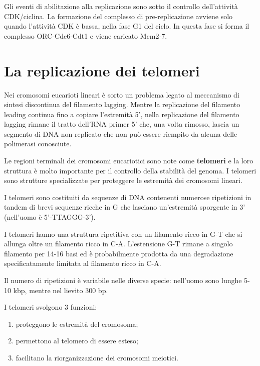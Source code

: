 \documentclass[11pt]{book}
\begin{document}
Gli eventi di abilitazione alla replicazione sono sotto il controllo
dell'attività CDK/ciclina. La formazione del complesso di
pre-replicazione avviene solo quando l'attività CDK è bassa, nella fase
G1 del ciclo. In questa fase si forma il complesso ORC-Cdc6-Cdt1 e viene
caricato Mcm2-7.

\section{La replicazione dei
telomeri}\label{la-replicazione-dei-telomeri}

Nei cromosomi eucarioti lineari è sorto un problema legato al meccanismo
di sintesi discontinua del filamento lagging. Mentre la replicazione del
filamento leading continua fino a copiare l'estremità 5', nella
replicazione del filamento lagging rimane il tratto dell'RNA primer 5'
che, una volta rimosso, lascia un segmento di DNA non replicato che non
può essere riempito da alcuna delle polimerasi conosciute.

Le regioni terminali dei cromosomi eucariotici sono note come
\textbf{telomeri} e la loro struttura è molto importante per il
controllo della stabilità del genoma. I telomeri sono strutture
specializzate per proteggere le estremità dei cromosomi lineari.

I telomeri sono costituiti da sequenze di DNA contenenti numerose
ripetizioni in tandem di brevi sequenze ricche in G che lasciano
un'estremità sporgente in 3' (nell'uomo è 5'-TTAGGG-3').

I telomeri hanno una struttura ripetitiva con un filamento ricco in G-T
che si allunga oltre un filamento ricco in C-A. L'estensione G-T rimane
a singolo filamento per 14-16 basi ed è probabilmente prodotta da una
degradazione specificatamente limitata al filamento ricco in C-A.

Il numero di ripetizioni è variabile nelle diverse specie: nell'uomo
sono lunghe 5-10 kbp, mentre nel lievito 300 bp.

I telomeri svolgono 3 funzioni:

\begin{enumerate}
\def\labelenumi{\arabic{enumi}.}
\itemsep1pt\parskip0pt
\item
  proteggono le estremità del cromosoma;
\item
  permettono al telomero di essere esteso;
\item
  facilitano la riorganizzazione dei cromosomi meiotici.
\end{enumerate}
\end{document}
